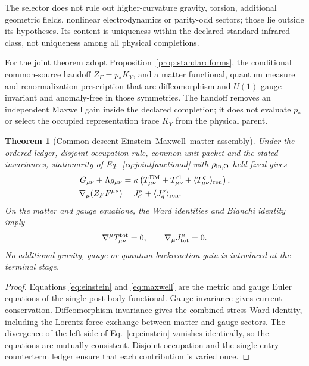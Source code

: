 \documentclass[11pt]{article}
\newtheorem{theorem}{Theorem}
\begin{document}
The selector does not rule out higher-curvature gravity, torsion, additional
geometric fields, nonlinear electrodynamics or parity-odd sectors; those lie
outside its hypotheses.  Its content is uniqueness within the declared
standard infrared class, not uniqueness among all physical completions.

For the joint theorem adopt Proposition~\ref{prop:standardforms}, the
conditional common-source handoff $Z_F=p_*K_Y$, and a matter functional,
quantum measure and renormalization prescription that are diffeomorphism and
$U(1)$ gauge invariant and anomaly-free in those symmetries.  The handoff
removes an independent Maxwell gain inside the declared completion; it does
not evaluate $p_*$ or select the occupied representation trace $K_Y$ from the
physical parent.

\begin{theorem}[Common-descent Einstein--Maxwell--matter assembly]
\label{thm:assembly}
Under the ordered ledger, disjoint occupation rule, common unit packet and the
stated invariances, stationarity of Eq.~\eqref{eq:jointfunctional} with
$\rho_{\rm in,O}$ held fixed gives
\begin{align}
G_{\mu\nu}+\Lambda g_{\mu\nu}
&=\kappa\left(T^{\rm EM}_{\mu\nu}+T^{\rm cl}_{\mu\nu}
+\langle T^q_{\mu\nu}\rangle_{\rm ren}\right),
\label{eq:einstein}\\
\nabla_\mu(Z_FF^{\mu\nu})
&=J_{\rm cl}^{\nu}+\langle J_q^\nu\rangle_{\rm ren}.
\label{eq:maxwell}
\end{align}
On the matter and gauge equations, the Ward identities and Bianchi identity
imply
\begin{equation}
\nabla^\mu T^{\rm tot}_{\mu\nu}=0,
\qquad
\nabla_\mu J_{\rm tot}^{\mu}=0.
\label{eq:ward}
\end{equation}
No additional gravity, gauge or quantum-backreaction gain is introduced at the
terminal stage.
\end{theorem}
\begin{proof}
Equations \eqref{eq:einstein} and \eqref{eq:maxwell} are the metric and gauge
Euler equations of the single post-body functional. Gauge invariance gives
current conservation. Diffeomorphism invariance gives the combined stress
Ward identity, including the Lorentz-force exchange between matter and gauge
sectors. The divergence of the left side of Eq.~\eqref{eq:einstein} vanishes
identically, so the equations are mutually consistent. Disjoint occupation
and the single-entry counterterm ledger ensure that each contribution is varied
once.
\end{proof}
\end{document}
